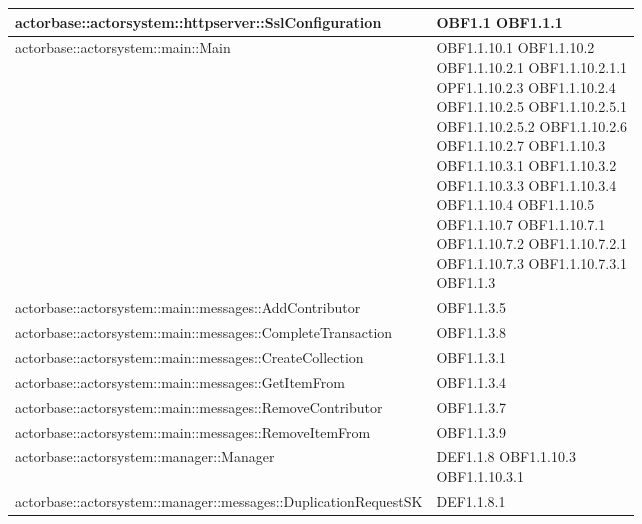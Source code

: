 \documentclass{scalatekids-article}
\begin{document}
\begin{longtable}[H]{|p{11.5cm}|p{5.5cm}|}
\hline
actorbase::actorsystem::httpserver::SslConfiguration & \multiLineCell[t]{OBF1.1 OBF1.1.1\\}\\
\hline
actorbase::actorsystem::main::Main & \multiLineCell[t]{OBF1.1.10.1 OBF1.1.10.2\\OBF1.1.10.2.1 OBF1.1.10.2.1.1\\OPF1.1.10.2.3 OBF1.1.10.2.4\\OBF1.1.10.2.5 OBF1.1.10.2.5.1\\OBF1.1.10.2.5.2 OBF1.1.10.2.6\\OBF1.1.10.2.7 OBF1.1.10.3\\OBF1.1.10.3.1 OBF1.1.10.3.2\\OBF1.1.10.3.3 OBF1.1.10.3.4\\OBF1.1.10.4 OBF1.1.10.5\\OBF1.1.10.7 OBF1.1.10.7.1\\OBF1.1.10.7.2 OBF1.1.10.7.2.1\\OBF1.1.10.7.3 OBF1.1.10.7.3.1\\OBF1.1.3}\\
\hline
actorbase::actorsystem::main::messages::AddContributor & \multiLineCell[t]{OBF1.1.3.5\\}\\
\hline
actorbase::actorsystem::main::messages::CompleteTransaction & \multiLineCell[t]{OBF1.1.3.8\\}\\
\hline
actorbase::actorsystem::main::messages::CreateCollection & \multiLineCell[t]{OBF1.1.3.1\\}\\
\hline
actorbase::actorsystem::main::messages::GetItemFrom & \multiLineCell[t]{OBF1.1.3.4\\}\\
\hline
actorbase::actorsystem::main::messages::RemoveContributor & \multiLineCell[t]{OBF1.1.3.7\\}\\
\hline
actorbase::actorsystem::main::messages::RemoveItemFrom & \multiLineCell[t]{OBF1.1.3.9\\}\\
\hline
actorbase::actorsystem::manager::Manager & \multiLineCell[t]{DEF1.1.8 OBF1.1.10.3\\OBF1.1.10.3.1\\}\\
\hline
actorbase::actorsystem::manager::messages::DuplicationRequestSK & \multiLineCell[t]{DEF1.1.8.1\\}\\

\end{longtable}
\end{document}
